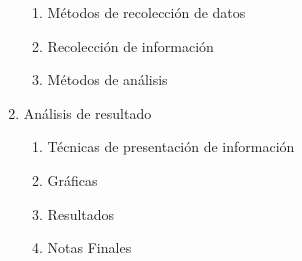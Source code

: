 \documentclass[12pt]{report}
\begin{document}
\begin{enumerate}
\begin{enumerate}
  \item Métodos de recolección de datos
  \item Recolección de información
  \item Métodos de análisis  
  \end{enumerate}
\item Análisis de resultado
  \begin{enumerate}
  \item Técnicas de presentación de información
  \item Gráficas
  \item Resultados
  \item Notas Finales
  \end{enumerate}
\end{enumerate}

\end{document}
